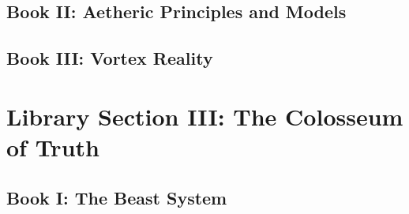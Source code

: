 \documentclass[a4paper,12pt]{book}
\begin{document}
\chapter{Book II: Aetheric Principles and Models}









\chapter{Book III: Vortex Reality}




\part{Library Section III: The Colosseum of Truth}

\chapter{Book I: The Beast System}







\end{document}
